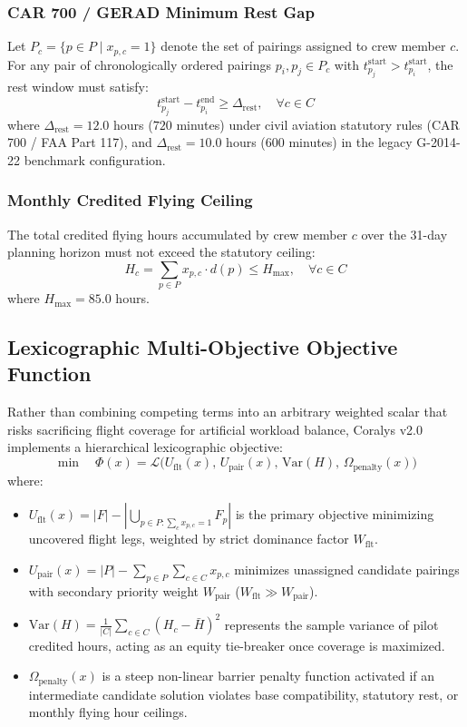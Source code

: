 \documentclass[journal]{IEEEtran}
\begin{document}
\subsubsection{CAR 700 / GERAD Minimum Rest Gap}
Let $P_c = \{p \in P \mid x_{p,c} = 1\}$ denote the set of pairings assigned to crew member $c$. For any pair of chronologically ordered pairings $p_i, p_j \in P_c$ with $t^{\text{start}}_{p_j} > t^{\text{start}}_{p_i}$, the rest window must satisfy:
\begin{equation}
t^{\text{start}}_{p_j} - t^{\text{end}}_{p_i} \ge \Delta_{\text{rest}}, \quad \forall c \in C
\end{equation}
where $\Delta_{\text{rest}} = 12.0$ hours ($720$ minutes) under civil aviation statutory rules (CAR 700 / FAA Part 117), and $\Delta_{\text{rest}} = 10.0$ hours ($600$ minutes) in the legacy G-2014-22 benchmark configuration.

\subsubsection{Monthly Credited Flying Ceiling}
The total credited flying hours accumulated by crew member $c$ over the 31-day planning horizon must not exceed the statutory ceiling:
\begin{equation}
H_c = \sum_{p \in P} x_{p,c} \cdot d(p) \le H_{\max}, \quad \forall c \in C
\end{equation}
where $H_{\max} = 85.0$ hours.

\subsection{Lexicographic Multi-Objective Objective Function}

Rather than combining competing terms into an arbitrary weighted scalar that risks sacrificing flight coverage for artificial workload balance, Coralys v2.0 implements a hierarchical lexicographic objective:
\begin{equation}
\min \quad \Phi(x) = \mathcal{L}\Big(U_{\text{flt}}(x), \, U_{\text{pair}}(x), \, \text{Var}(H), \, \Omega_{\text{penalty}}(x)\Big)
\end{equation}
where:
\begin{itemize}
    \item $U_{\text{flt}}(x) = |F| - |\bigcup_{p \in P : \sum_c x_{p,c}=1} F_p|$ is the primary objective minimizing uncovered flight legs, weighted by strict dominance factor $W_{\text{flt}}$.
    \item $U_{\text{pair}}(x) = |P| - \sum_{p \in P} \sum_{c \in C} x_{p,c}$ minimizes unassigned candidate pairings with secondary priority weight $W_{\text{pair}}$ ($W_{\text{flt}} \gg W_{\text{pair}}$).
    \item $\text{Var}(H) = \frac{1}{|C|} \sum_{c \in C} (H_c - \bar{H})^2$ represents the sample variance of pilot credited hours, acting as an equity tie-breaker once coverage is maximized.
    \item $\Omega_{\text{penalty}}(x)$ is a steep non-linear barrier penalty function activated if an intermediate candidate solution violates base compatibility, statutory rest, or monthly flying hour ceilings.
\end{itemize}
\end{document}

